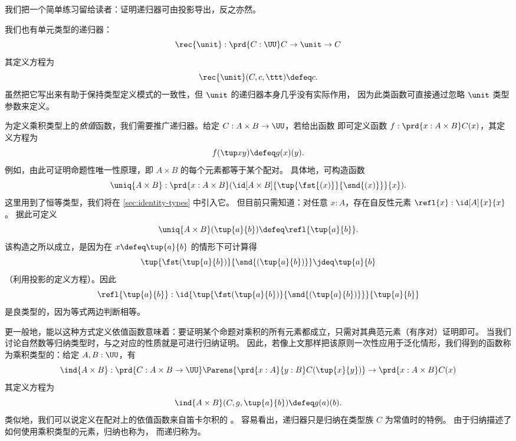 我们把一个简单练习留给读者：证明递归器可由投影导出，反之亦然。

%
我们也有单元类型的递归器：
\[\rec{\unit} : \prd{C:\UU}C \to \unit \to C\]
其定义方程为
\[ \rec{\unit}(C,c,\ttt) \defeq c. \]
虽然把它写出来有助于保持类型定义模式的一致性，但 $\unit$ 的递归器本身几乎没有实际作用，
因为此类函数可直接通过忽略 $\unit$ 类型参数来定义。

为定义乘积类型上的\emph{依值}函数，我们需要推广递归器。给定 $C: A \times B \to \UU$，若给出函数
即可定义函数 $f : \prd{x : A \times B} C(x)$，其定义方程为
\[ f(\tup x y) \defeq g(x)(y). \] 
例如，由此可证明命题性唯一性原理，即 $A\times B$ 的每个元素都等于某个配对。
%
具体地，可构造函数
\[ \uniq{A\times B} : \prd{x:A \times B} (\id[A\times B]{\tup{\fst {(x)}}{\snd {(x)}}}{x}). \]
这里用到了恒等类型，我们将在 \cref{sec:identity-types} 中引入它。
但目前只需知道：对任意 $x:A$，存在自反性元素 $\refl{x} : \id[A]{x}{x}$。
据此可定义
\label{uniquenessproduct}
\[ \uniq{A\times B}(\tup{a}{b}) \defeq \refl{\tup{a}{b}}. \]
该构造之所以成立，是因为在 $x \defeq \tup{a}{b}$ 的情形下可计算得
\[ \tup{\fst(\tup{a}{b})}{\snd{(\tup{a}{b})}} \jdeq \tup{a}{b} \]
（利用投影的定义方程）。因此
\[ \refl{\tup{a}{b}} : \id{\tup{\fst(\tup{a}{b})}{\snd{(\tup{a}{b})}}}{\tup{a}{b}} \]
是良类型的，因为等式两边判断相等。

更一般地，能以这种方式定义依值函数意味着：要证明某个命题对乘积的所有元素都成立，只需对其典范元素（有序对）证明即可。
当我们讨论自然数等归纳类型时，与之对应的性质就是可进行归纳证明。
因此，若像上文那样把该原则一次性应用于泛化情形，我们得到的函数称为乘积类型的：给定 $A,B : \UU$，有
%
\[ \ind{A\times B} : \prd{C:A \times B \to \UU}
\Parens{\prd{x:A}{y:B} C(\tup{x}{y})} \to \prd{x:A \times B} C(x) \]
其定义方程为
\[ \ind{A\times B}(C,g,\tup{a}{b}) \defeq g(a)(b). \]
类似地，我们可以说定义在配对上的依值函数来自笛卡尔积的
%
%
。
容易看出，递归器只是归纳在类型族 $C$ 为常值时的特例。
由于归纳描述了如何使用乘积类型的元素，归纳也称为，
%
而递归称为。
%
%
%

